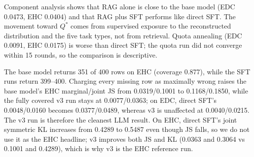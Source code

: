 Component analysis shows that RAG alone is close to the base model (EDC 0.0473,
EHC 0.0404) and that RAG plus SFT performs like direct SFT. The movement
toward $Q^{\ast}$ comes from supervised exposure to the reconstructed distribution
and the five task types, not from retrieval. Quota annealing (EDC 0.0091, EHC
0.0175) is worse than direct SFT; the quota run did not converge within 15
rounds, so the comparison is descriptive.

The base model returns 351 of 400 rows on EHC (coverage 0.877), while the SFT runs
return 399--400. Charging every missing row as maximally wrong raises the base
model's EHC marginal/joint JS from 0.0319/0.1001 to 0.1168/0.1850, while the
fully covered v3 run stays at 0.0077/0.0363; on EDC, direct SFT's 0.0048/0.0160
becomes 0.0377/0.0489, whereas v3 is unaffected at 0.0040/0.0215. The v3 run is
therefore the cleanest LLM result. On EHC, direct SFT's joint symmetric KL
increases from 0.4289 to 0.5487 even though JS falls, so we do not use it as the
EHC headline; v3 improves both JS and KL (0.0363 and 0.3064 vs 0.1001 and
0.4289), which is why v3 is the EHC reference run.
